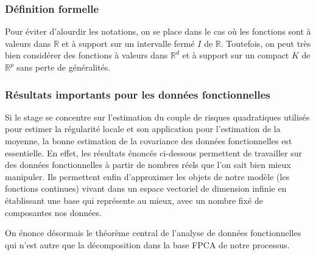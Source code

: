 \subsubsection{Définition formelle}

Pour éviter d'alourdir les notations, on se place dans le cas où les fonctions sont à valeurs dans $\mathds R$ et à support sur un intervalle fermé $I$ de $\mathds R$. Toutefois, on peut très bien considérer des fonctions à valeurs dans $\mathds R^d$ et à support sur un compact $K$ de $\mathds R^p$ sans perte de généralités.



\subsubsection{Résultats importants pour les données fonctionnelles}


Si le stage se concentre sur l'estimation du couple de risques quadratiques utilisés pour estimer la régularité locale et son application pour l'estimation de la moyenne, la  bonne estimation de la covariance des données fonctionnelles est essentielle. En effet, les résultats énoncés ci-dessous permettent de travailler sur des données fonctionnelles à partir de nombres réels que l'on sait bien mieux manipuler. Ils permettent enfin d'approximer les objets de notre modèle (les fonctions continues) vivant dans un espace vectoriel de dimension infinie en établissant une base qui représente au mieux, avec un nombre fixé de composantes nos données.

\bigskip

On énonce désormais le théorème central de l'analyse de données fonctionnelles qui n'est autre que la décomposition dans la base FPCA de notre processus.

